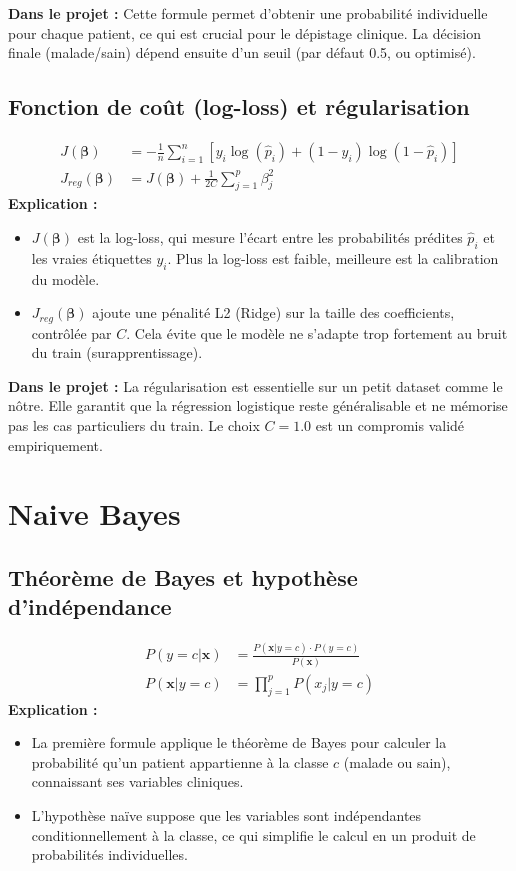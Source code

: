 \documentclass[a4paper,12pt]{article}
\begin{document}
\textbf{Dans le projet :} Cette formule permet d'obtenir une probabilité individuelle pour chaque patient, ce qui est crucial pour le dépistage clinique. La décision finale (malade/sain) dépend ensuite d'un seuil (par défaut 0.5, ou optimisé).

\subsection*{Fonction de coût (log-loss) et régularisation}
\begin{align*}
J(\boldsymbol{\beta}) &= -\frac{1}{n} \sum_{i=1}^n \left[ y_i \log(\hat{p}_i) + (1 - y_i) \log(1 - \hat{p}_i) \right] \\
J_{reg}(\boldsymbol{\beta}) &= J(\boldsymbol{\beta}) + \frac{1}{2C} \sum_{j=1}^p \beta_j^2
\end{align*}
\textbf{Explication :}
\begin{itemize}
  \item $J(\boldsymbol{\beta})$ est la log-loss, qui mesure l'écart entre les probabilités prédites $\hat{p}_i$ et les vraies étiquettes $y_i$. Plus la log-loss est faible, meilleure est la calibration du modèle.
  \item $J_{reg}(\boldsymbol{\beta})$ ajoute une pénalité L2 (Ridge) sur la taille des coefficients, contrôlée par $C$. Cela évite que le modèle ne s'adapte trop fortement au bruit du train (surapprentissage).
\end{itemize}

\textbf{Dans le projet :} La régularisation est essentielle sur un petit dataset comme le nôtre. Elle garantit que la régression logistique reste généralisable et ne mémorise pas les cas particuliers du train. Le choix $C=1.0$ est un compromis validé empiriquement.

\section{Naive Bayes}

\subsection*{Théorème de Bayes et hypothèse d'indépendance}
\begin{align*}
P(y=c|\mathbf{x}) &= \frac{P(\mathbf{x}|y=c) \cdot P(y=c)}{P(\mathbf{x})} \\
P(\mathbf{x}|y=c) &= \prod_{j=1}^p P(x_j|y=c)
\end{align*}
\textbf{Explication :}
\begin{itemize}
  \item La première formule applique le théorème de Bayes pour calculer la probabilité qu'un patient appartienne à la classe $c$ (malade ou sain), connaissant ses variables cliniques.
  \item L'hypothèse naïve suppose que les variables sont indépendantes conditionnellement à la classe, ce qui simplifie le calcul en un produit de probabilités individuelles.
\end{itemize}
\end{document}
